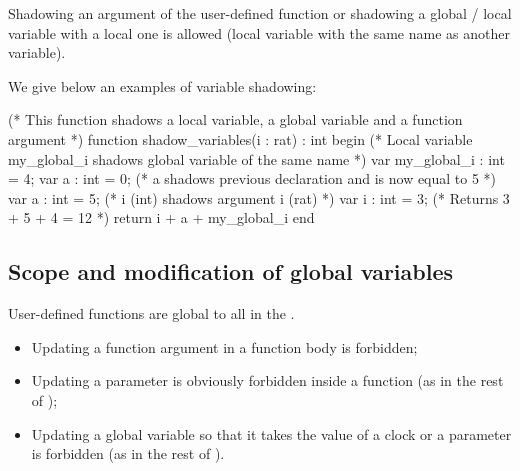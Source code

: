 Shadowing an argument of the user-defined function or shadowing a global / local variable with a local one is allowed (local variable with the same name as another variable).


\begin{example}\label{example:shadowing}
We give below an examples of variable shadowing:

\begin{IMITATORmodel}
(* This function shadows a local variable, a global variable and a function argument *)
function shadow_variables(i : rat) : int
begin
	(* Local variable my_global_i shadows global variable of the same name *)
	var my_global_i : int = 4;
	var a : int = 0;
	(* a shadows previous declaration and is now equal to 5 *)
	var a : int = 5;
	(* i (int) shadows argument i (rat) *)
	var i : int = 3;
	(* Returns 3 + 5 + 4 = 12 *)
	return i + a + my_global_i
end
\end{IMITATORmodel}
\end{example}


%
%
%
%
%


\subsection{Scope and modification of global variables}

User-defined functions are global to all \IPTA{} in the \NIPTA{}.

\begin{itemize}
	\item Updating a function argument in a function body is forbidden;
	\item Updating a parameter is obviously forbidden inside a function (as in the rest of \imitator{});
	\item Updating a global variable so that it takes the value of a clock or a parameter is forbidden (as in the rest of \imitator{}).
\end{itemize}

